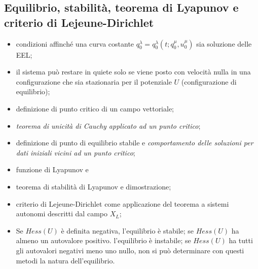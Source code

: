 \documentclass{article}
\theoremstyle{remark}
\begin{document}
\subsection{Equilibrio, stabilità, teorema di Lyapunov e criterio di Lejeune-Dirichlet}
\begin{itemize}
    \item condizioni affinché una curva costante $q^\lambda_0=q^\lambda_0(t;q_0^\mu,u_0^\mu)$ sia soluzione delle EEL;
    \item il sistema può restare in quiete solo se viene posto con velocità nulla in una configurazione che sia stazionaria per il potenziale $U$ (configurazione di equilibrio);
    \item definizione di punto critico di un campo vettoriale;
    \item \textit{teorema di unicità di Cauchy applicato ad un punto critico};
    \item definizione di punto di equilibrio stabile e \textit{comportamento delle soluzioni per dati iniziali vicini ad un punto critico};
    \item funzione di Lyapunov e 
    \item teorema di stabilità di Lyapunov e dimostrazione;
    \item criterio di Lejeune-Dirichlet come applicazione del teorema a sistemi autonomi descritti dal campo $X_L$;
    \item Se $Hess(U)$ è definita negativa, l'equilibrio è stabile; se $Hess(U)$ ha almeno un autovalore positivo. l'equilibrio è instabile; se $Hess(U)$ ha tutti gli autovalori negativi meno uno nullo, non si può determinare con questi metodi la natura dell'equilibrio.
\end{itemize}
\end{document}
